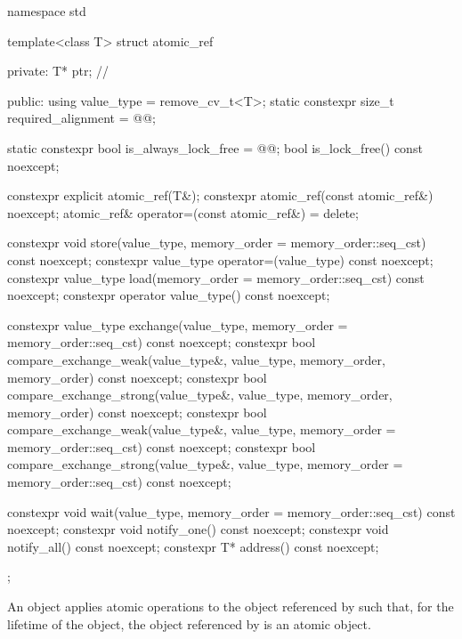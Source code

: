 %
%
\begin{codeblock}
namespace std {
  template<class T> struct atomic_ref {
  private:
    T* ptr;             // \expos

  public:
    using value_type = remove_cv_t<T>;
    static constexpr size_t required_alignment = @@;

    static constexpr bool is_always_lock_free = @@;
    bool is_lock_free() const noexcept;

    constexpr explicit atomic_ref(T&);
    constexpr atomic_ref(const atomic_ref&) noexcept;
    atomic_ref& operator=(const atomic_ref&) = delete;

    constexpr void store(value_type, memory_order = memory_order::seq_cst) const noexcept;
    constexpr value_type operator=(value_type) const noexcept;
    constexpr value_type load(memory_order = memory_order::seq_cst) const noexcept;
    constexpr operator value_type() const noexcept;

    constexpr value_type exchange(value_type,
                                  memory_order = memory_order::seq_cst) const noexcept;
    constexpr bool compare_exchange_weak(value_type&, value_type,
                                         memory_order, memory_order) const noexcept;
    constexpr bool compare_exchange_strong(value_type&, value_type,
                                           memory_order, memory_order) const noexcept;
    constexpr bool compare_exchange_weak(value_type&, value_type,
                                         memory_order = memory_order::seq_cst) const noexcept;
    constexpr bool compare_exchange_strong(value_type&, value_type,
                                           memory_order = memory_order::seq_cst) const noexcept;

    constexpr void wait(value_type, memory_order = memory_order::seq_cst) const noexcept;
    constexpr void notify_one() const noexcept;
    constexpr void notify_all() const noexcept;
    constexpr T* address() const noexcept;
  };
}
\end{codeblock}

\pnum
An  object applies atomic operations to
the object referenced by  such that,
for the lifetime of the  object,
the object referenced by  is an atomic object.

